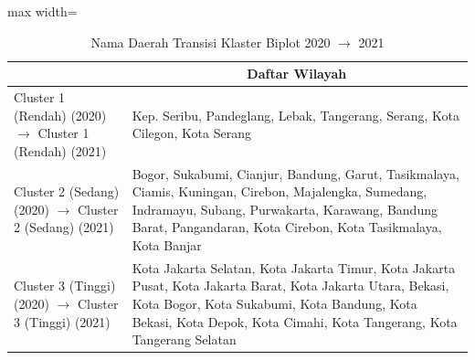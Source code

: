 \begin{table}[H]
\centering
\caption{Nama Daerah Transisi Klaster Biplot 2020 \(\rightarrow\) 2021} \label{tab:app1biplot_trans_name_2020x2021}
\begin{adjustbox}{max width=\textwidth}
\begin{tabular}{|>{\centering\arraybackslash}p{4cm}|p{10cm}|}
\hline
\multicolumn{1}{|c|}{\textbf{Kategori}} & \multicolumn{1}{c|}{\textbf{Daftar Wilayah}} \\
\hline
Cluster 1 (Rendah) (2020) \(\rightarrow\) Cluster 1 (Rendah) (2021) & Kep. Seribu, Pandeglang, Lebak, Tangerang, Serang, Kota Cilegon, Kota Serang \\
\hline
Cluster 2 (Sedang) (2020) \(\rightarrow\) Cluster 2 (Sedang) (2021) & Bogor, Sukabumi, Cianjur, Bandung, Garut, Tasikmalaya, Ciamis, Kuningan, Cirebon, Majalengka, Sumedang, Indramayu, Subang, Purwakarta, Karawang, Bandung Barat, Pangandaran, Kota Cirebon, Kota Tasikmalaya, Kota Banjar \\
\hline
Cluster 3 (Tinggi) (2020) \(\rightarrow\) Cluster 3 (Tinggi) (2021) & Kota Jakarta Selatan, Kota Jakarta Timur, Kota Jakarta Pusat, Kota Jakarta Barat, Kota Jakarta Utara, Bekasi, Kota Bogor, Kota Sukabumi, Kota Bandung, Kota Bekasi, Kota Depok, Kota Cimahi, Kota Tangerang, Kota Tangerang Selatan \\
\hline
\end{tabular}
\end{adjustbox}
\end{table}